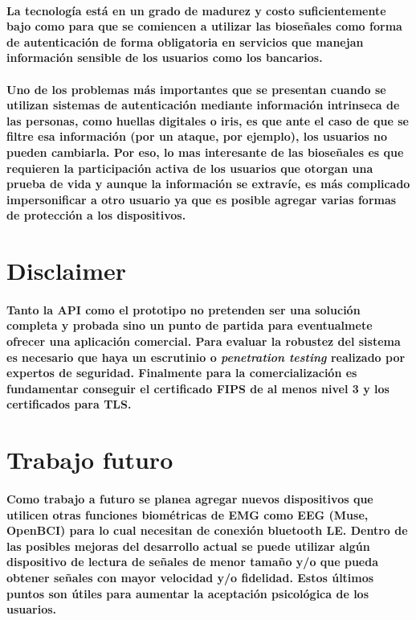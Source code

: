 \documentclass{article}
\begin{document}
\paragraph{
La tecnología está en un grado de madurez y costo suficientemente bajo como para que se comiencen a utilizar las bioseñales como forma de autenticación de forma obligatoria en servicios que manejan información sensible de los usuarios como los bancarios.
}
\paragraph{
Uno de los problemas más importantes que se presentan cuando se utilizan sistemas de autenticación mediante información intrinseca de las personas, como huellas digitales o iris, es que ante el caso de que se filtre esa información (por un ataque, por ejemplo), los usuarios no pueden cambiarla. Por eso, lo mas interesante de las bioseñales es que requieren la participación activa de los usuarios que otorgan una prueba de vida y aunque la información se extravíe, es más complicado impersonificar a otro usuario ya que es posible agregar varias formas de protección a los dispositivos.
}
\section{Disclaimer}
\paragraph{
Tanto la API como el prototipo no pretenden ser una solución completa y probada sino un punto de partida para eventualmete ofrecer una aplicación comercial. Para evaluar la robustez del sistema es necesario que haya un escrutinio o \textit{penetration testing} realizado por expertos de seguridad. Finalmente para la comercialización es fundamentar conseguir el certificado FIPS de al menos nivel 3 y los certificados para TLS.
}
\section{Trabajo futuro}
\paragraph{
Como trabajo a futuro se planea agregar nuevos dispositivos que utilicen otras funciones biométricas de EMG como EEG (Muse, OpenBCI) para lo cual necesitan de conexión bluetooth LE. Dentro de las posibles mejoras del desarrollo actual se puede utilizar algún dispositivo de lectura de señales de menor tamaño y/o que pueda obtener señales con mayor velocidad y/o fidelidad. Estos últimos puntos son útiles para aumentar la aceptación psicológica de los usuarios.
}
\end{document}
